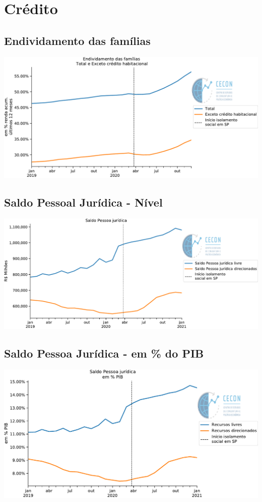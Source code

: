 \documentclass{SelfArx}
\begin{document}
\section*{Crédito}
\label{sec:org52e7f4b}

\subsection*{Endividamento das famílias}
\label{sec:orgfb7f6f6}

\begin{center}
\includegraphics[width=.9\linewidth]{./figs/Credito/EndividamentoFamilias.pdf}
\end{center}


\subsection*{Saldo Pessoal Jurídica - Nível}
\label{sec:org318c149}

\begin{center}
\includegraphics[width=.9\linewidth]{./figs/Credito/SaldoPJ.pdf}
\end{center}



\subsection*{Saldo Pessoa Jurídica - em \% do PIB}
\label{sec:orga711f1b}
\begin{center}
\includegraphics[width=.9\linewidth]{./figs/Credito/SaldoPJ_PIB.pdf}
\end{center}
\end{document}
